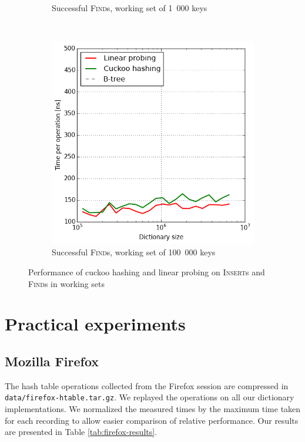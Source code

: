 \begin{figure}
\begin{subfigure}[t]{0.31\textwidth}
	\caption{Successful \textsc{Find}s, working set of 1~000 keys}
\end{subfigure}
~
\begin{subfigure}[t]{0.31\textwidth}
	\includegraphics[width=\textwidth]{img/performance/hashing-4}
	\caption{Successful \textsc{Find}s, working set of 100~000 keys}
\end{subfigure}
\caption{Performance of cuckoo hashing and linear probing on \textsc{Insert}s
	and \textsc{Find}s in working sets}
\label{fig:hashing-performance}
\end{figure}

\section{Practical experiments}
\subsection{Mozilla Firefox}
The hash table operations collected from the Firefox session are compressed
in \texttt{data/firefox-htable.tar.gz}. We replayed the operations on all our
dictionary implementations. We normalized the measured times by the maximum
time taken for each recording to allow easier comparison of relative
performance. Our results are presented in Table \ref{tab:firefox-results}.

